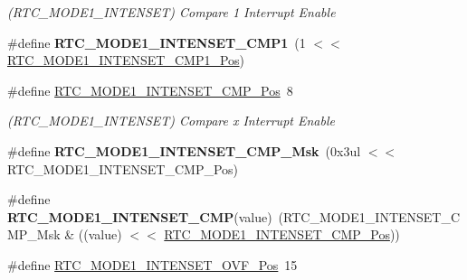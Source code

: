 \begin{DoxyCompactItemize}
\begin{DoxyCompactList}\small\item\em (R\+T\+C\+\_\+\+M\+O\+D\+E1\+\_\+\+I\+N\+T\+E\+N\+S\+E\+T) Compare 1 Interrupt Enable \end{DoxyCompactList}\item 
\hypertarget{group___s_a_m_l21___r_t_c_gacfcc1e63f61e8d0fd4110f6fb3d04b07}{}\#define {\bfseries R\+T\+C\+\_\+\+M\+O\+D\+E1\+\_\+\+I\+N\+T\+E\+N\+S\+E\+T\+\_\+\+C\+M\+P1}~(1 $<$$<$ \hyperlink{group___s_a_m_l21___r_t_c_gae7b781ed1f8cffb051ad9fba877630f0}{R\+T\+C\+\_\+\+M\+O\+D\+E1\+\_\+\+I\+N\+T\+E\+N\+S\+E\+T\+\_\+\+C\+M\+P1\+\_\+\+Pos})\label{group___s_a_m_l21___r_t_c_gacfcc1e63f61e8d0fd4110f6fb3d04b07}

\item 
\hypertarget{group___s_a_m_l21___r_t_c_gadb593c31ce067b73c78ba0b4fbddcf3f}{}\#define \hyperlink{group___s_a_m_l21___r_t_c_gadb593c31ce067b73c78ba0b4fbddcf3f}{R\+T\+C\+\_\+\+M\+O\+D\+E1\+\_\+\+I\+N\+T\+E\+N\+S\+E\+T\+\_\+\+C\+M\+P\+\_\+\+Pos}~8\label{group___s_a_m_l21___r_t_c_gadb593c31ce067b73c78ba0b4fbddcf3f}

\begin{DoxyCompactList}\small\item\em (R\+T\+C\+\_\+\+M\+O\+D\+E1\+\_\+\+I\+N\+T\+E\+N\+S\+E\+T) Compare x Interrupt Enable \end{DoxyCompactList}\item 
\hypertarget{group___s_a_m_l21___r_t_c_gaa6ce26117bcf02cb52e06cc251e7c570}{}\#define {\bfseries R\+T\+C\+\_\+\+M\+O\+D\+E1\+\_\+\+I\+N\+T\+E\+N\+S\+E\+T\+\_\+\+C\+M\+P\+\_\+\+Msk}~(0x3ul $<$$<$ R\+T\+C\+\_\+\+M\+O\+D\+E1\+\_\+\+I\+N\+T\+E\+N\+S\+E\+T\+\_\+\+C\+M\+P\+\_\+\+Pos)\label{group___s_a_m_l21___r_t_c_gaa6ce26117bcf02cb52e06cc251e7c570}

\item 
\hypertarget{group___s_a_m_l21___r_t_c_gabbe90a64baf2b73cd0b69cd5d1ebcea9}{}\#define {\bfseries R\+T\+C\+\_\+\+M\+O\+D\+E1\+\_\+\+I\+N\+T\+E\+N\+S\+E\+T\+\_\+\+C\+M\+P}(value)~(R\+T\+C\+\_\+\+M\+O\+D\+E1\+\_\+\+I\+N\+T\+E\+N\+S\+E\+T\+\_\+\+C\+M\+P\+\_\+\+Msk \& ((value) $<$$<$ \hyperlink{group___s_a_m_l21___r_t_c_gadb593c31ce067b73c78ba0b4fbddcf3f}{R\+T\+C\+\_\+\+M\+O\+D\+E1\+\_\+\+I\+N\+T\+E\+N\+S\+E\+T\+\_\+\+C\+M\+P\+\_\+\+Pos}))\label{group___s_a_m_l21___r_t_c_gabbe90a64baf2b73cd0b69cd5d1ebcea9}

\item 
\hypertarget{group___s_a_m_l21___r_t_c_gad8e469d057fdd0a718e92d16b5624319}{}\#define \hyperlink{group___s_a_m_l21___r_t_c_gad8e469d057fdd0a718e92d16b5624319}{R\+T\+C\+\_\+\+M\+O\+D\+E1\+\_\+\+I\+N\+T\+E\+N\+S\+E\+T\+\_\+\+O\+V\+F\+\_\+\+Pos}~15\label{group___s_a_m_l21___r_t_c_gad8e469d057fdd0a718e92d16b5624319}


\end{DoxyCompactItemize}
